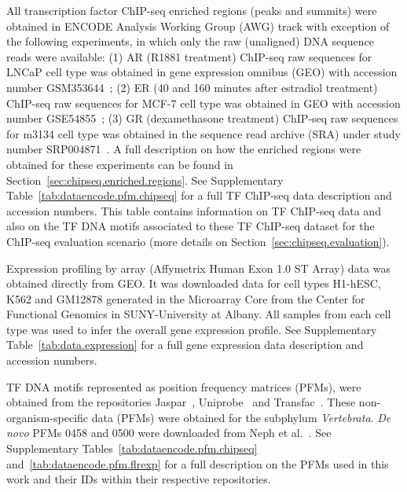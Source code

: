 All transcription factor ChIP-seq enriched regions (peaks and summits) were obtained in ENCODE Analysis Working Group (AWG) track with exception of the following experiments, in which only the raw (unaligned) DNA sequence reads were available: (1) AR (R1881 treatment) ChIP-seq raw sequences for LNCaP cell type was obtained in gene expression omnibus (GEO) with accession number GSM353644~\cite{yu2010}; (2) ER (40 and 160 minutes after estradiol treatment) ChIP-seq raw sequences for MCF-7 cell type was obtained in GEO with accession number GSE54855~\cite{guertin2014}; (3) GR (dexamethasone treatment) ChIP-seq raw sequences for m3134 cell type was obtained in the sequence read archive (SRA) under study number SRP004871~\cite{john2011}. A full description on how the enriched regions were obtained for these experiments can be found in Section~\ref{sec:chipseq.enriched.regions}. See Supplementary Table~\ref{tab:dataencode.pfm.chipseq} for a full TF ChIP-seq data description and accession numbers. This table contains information on TF ChIP-seq data and also on the TF DNA motifs associated to these TF ChIP-seq dataset for the ChIP-seq evaluation scenario (more details on Section~\ref{sec:chipseq.evaluation}).

Expression profiling by array (Affymetrix Human Exon 1.0 ST Array) data was obtained directly from GEO. It was downloaded data for cell types H1-hESC, K562 and GM12878 generated in the Microarray Core from the Center for Functional Genomics in SUNY-University at Albany. All samples from each cell type was used to infer the overall gene expression profile. See Supplementary Table~\ref{tab:data.expression} for a full gene expression data description and accession numbers.

TF DNA motifs represented as position frequency matrices (PFMs), were obtained from the repositories Jaspar~\cite{mathelier2014}, Uniprobe~\cite{robasky2011} and Transfac~\cite{matys2006}. These non-organism-specific data (PFMs) were obtained for the subphylum \emph{Vertebrata}. \emph{De novo} PFMs 0458 and 0500 were downloaded from Neph et al.~\cite{neph2012a}. See Supplementary Tables~\ref{tab:dataencode.pfm.chipseq} and~\ref{tab:dataencode.pfm.flrexp} for a full description on the PFMs used in this work and their IDs within their respective repositories.














